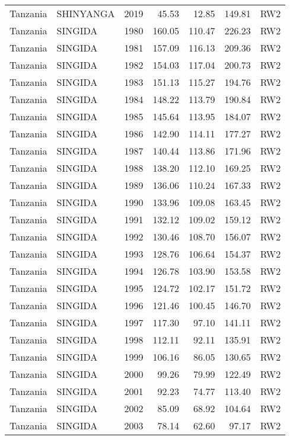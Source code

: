 \begin{longtable}{lllrrrl}
  Tanzania & SHINYANGA & 2019 & 45.53 & 12.85 & 149.81 & RW2 \\ 
  Tanzania & SINGIDA & 1980 & 160.05 & 110.47 & 226.23 & RW2 \\ 
  Tanzania & SINGIDA & 1981 & 157.09 & 116.13 & 209.36 & RW2 \\ 
  Tanzania & SINGIDA & 1982 & 154.03 & 117.04 & 200.73 & RW2 \\ 
  Tanzania & SINGIDA & 1983 & 151.13 & 115.27 & 194.76 & RW2 \\ 
  Tanzania & SINGIDA & 1984 & 148.22 & 113.79 & 190.84 & RW2 \\ 
  Tanzania & SINGIDA & 1985 & 145.64 & 113.95 & 184.07 & RW2 \\ 
  Tanzania & SINGIDA & 1986 & 142.90 & 114.11 & 177.27 & RW2 \\ 
  Tanzania & SINGIDA & 1987 & 140.44 & 113.86 & 171.96 & RW2 \\ 
  Tanzania & SINGIDA & 1988 & 138.20 & 112.10 & 169.25 & RW2 \\ 
  Tanzania & SINGIDA & 1989 & 136.06 & 110.24 & 167.33 & RW2 \\ 
  Tanzania & SINGIDA & 1990 & 133.96 & 109.08 & 163.45 & RW2 \\ 
  Tanzania & SINGIDA & 1991 & 132.12 & 109.02 & 159.12 & RW2 \\ 
  Tanzania & SINGIDA & 1992 & 130.46 & 108.70 & 156.07 & RW2 \\ 
  Tanzania & SINGIDA & 1993 & 128.76 & 106.64 & 154.37 & RW2 \\ 
  Tanzania & SINGIDA & 1994 & 126.78 & 103.90 & 153.58 & RW2 \\ 
  Tanzania & SINGIDA & 1995 & 124.72 & 102.17 & 151.72 & RW2 \\ 
  Tanzania & SINGIDA & 1996 & 121.46 & 100.45 & 146.70 & RW2 \\ 
  Tanzania & SINGIDA & 1997 & 117.30 & 97.10 & 141.11 & RW2 \\ 
  Tanzania & SINGIDA & 1998 & 112.11 & 92.11 & 135.91 & RW2 \\ 
  Tanzania & SINGIDA & 1999 & 106.16 & 86.05 & 130.65 & RW2 \\ 
  Tanzania & SINGIDA & 2000 & 99.26 & 79.99 & 122.49 & RW2 \\ 
  Tanzania & SINGIDA & 2001 & 92.23 & 74.77 & 113.40 & RW2 \\ 
  Tanzania & SINGIDA & 2002 & 85.09 & 68.92 & 104.64 & RW2 \\ 
  Tanzania & SINGIDA & 2003 & 78.14 & 62.60 & 97.17 & RW2 \\ 

\end{longtable}

